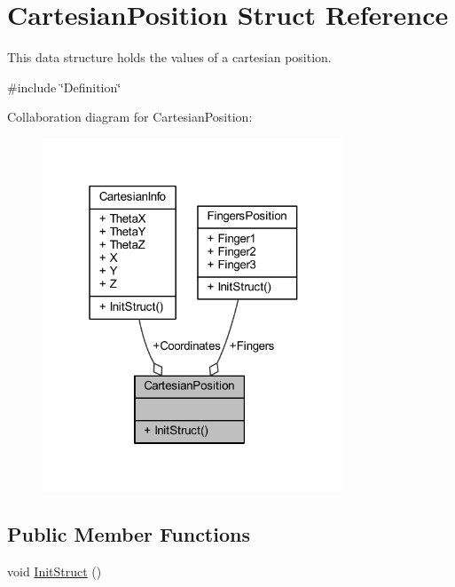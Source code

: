 \hypertarget{structCartesianPosition}{}\section{Cartesian\+Position Struct Reference}
\label{structCartesianPosition}


This data structure holds the values of a cartesian position.  




{\ttfamily \#include \char`\"{}Definition\char`\"{}}



Collaboration diagram for Cartesian\+Position\+:
\nopagebreak
\begin{figure}[H]
\begin{center}
\leavevmode
\includegraphics[width=256pt]{d0/df9/structCartesianPosition__coll__graph}
\end{center}
\end{figure}
\subsection*{Public Member Functions}
\begin{DoxyCompactItemize}
\item 
void \hyperlink{structCartesianPosition_a555e4355ff9b88f0088b3ffcfc56af96}{Init\+Struct} ()
\end{DoxyCompactItemize}
